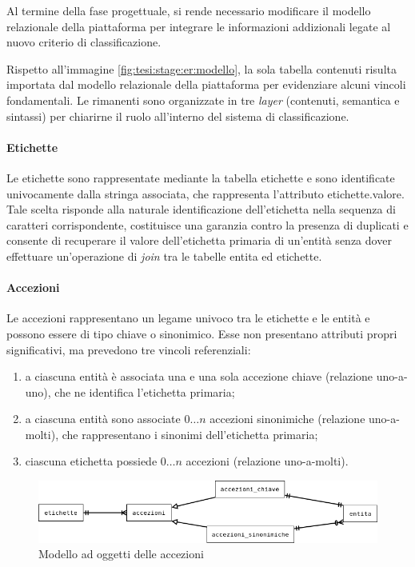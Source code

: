 Al termine della fase progettuale, si rende necessario modificare il modello relazionale della piattaforma per integrare le informazioni addizionali legate al nuovo criterio di classificazione.

Rispetto all'immagine \ref{fig:tesi:stage:er:modello}, la sola tabella \textsf{contenuti} risulta importata dal modello relazionale della piattaforma per evidenziare alcuni vincoli fondamentali. Le rimanenti sono organizzate in tre \textit{layer} (\textsf{contenuti}, \textsf{semantica} e \textsf{sintassi}) per chiarirne il ruolo all'interno del sistema di classificazione.

\paragraph{Etichette}
Le etichette sono rappresentate mediante la tabella \textsf{etichette} e sono identificate univocamente dalla stringa associata, che rappresenta l'attributo \textsf{etichette.valore}. Tale scelta risponde alla naturale identificazione dell'etichetta nella sequenza di caratteri corrispondente, costituisce una garanzia contro la presenza di duplicati e consente di recuperare il valore dell'etichetta primaria di un'entità senza dover effettuare un'operazione di \textit{join} tra le tabelle \textsf{entita} ed \textsf{etichette}.

\paragraph{Accezioni}
Le accezioni rappresentano un legame univoco tra le etichette e le entità e possono essere di tipo chiave o sinonimico. Esse non presentano attributi propri significativi, ma prevedono tre vincoli referenziali:
\begin{enumerate}
\item a ciascuna entità è associata una e una sola accezione chiave (relazione uno-a-uno), che ne identifica l'etichetta primaria;
\item a ciascuna entità sono associate $0\ldots n$ accezioni sinonimiche (relazione uno-a-molti), che rappresentano i sinonimi dell'etichetta primaria;
\item ciascuna etichetta possiede $0\ldots n$ accezioni (relazione uno-a-molti).
\end{enumerate}

\begin{figure}[ht]
	\begin{center}
		\includegraphics[width=12cm]{img/modello-oggetti.png}
		\caption{Modello ad oggetti delle accezioni}
		\label{fig:tesi:stage:er:accezioni}
	\end{center}
\end{figure}

